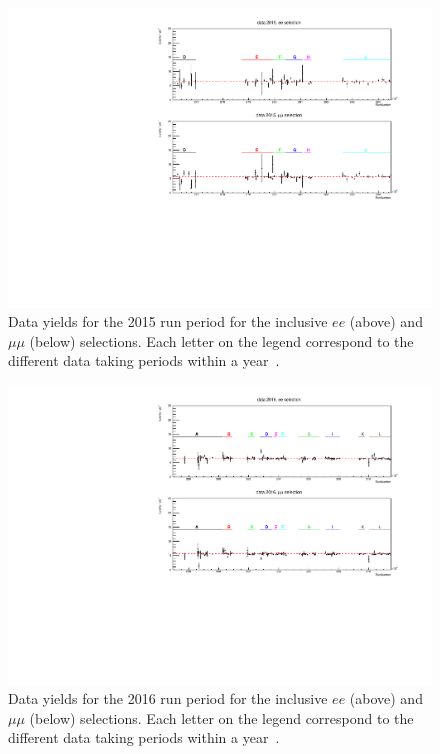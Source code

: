 \begin{figure}[ht]
\centering
\includegraphics[width=\textwidth]{figures/analysis/datamc/Yields/compare_data_yields2015.pdf}
\caption{Data yields for the 2015 run period for the inclusive $ee$ (above) and $\mu\mu$ (below) selections. Each letter on the legend correspond to the different data taking periods within a year~\cite{Aad:2019fac}.}
\label{fig:yields2015}
\end{figure}

\begin{figure}[ht]
\centering
\includegraphics[width=\textwidth]{figures/analysis/datamc/Yields/compare_data_yields2016.pdf}
\caption{Data yields for the 2016 run period for the inclusive $ee$ (above) and $\mu\mu$ (below) selections. Each letter on the legend correspond to the different data taking periods within a year~\cite{Aad:2019fac}.}
\label{fig:yields2016}
\end{figure}

